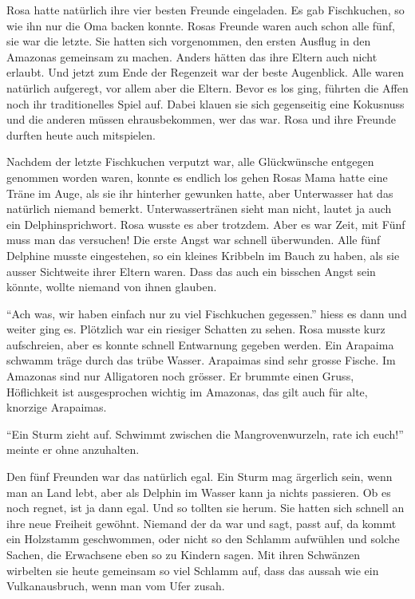Rosa hatte natürlich ihre vier besten Freunde eingeladen. Es gab Fischkuchen, so wie ihn nur die Oma backen konnte. Rosas Freunde waren auch schon alle fünf, sie war die letzte. Sie hatten sich vorgenommen, den ersten Ausflug in den Amazonas gemeinsam zu machen. Anders hätten das ihre Eltern auch nicht erlaubt. Und jetzt zum Ende der Regenzeit war der beste Augenblick. Alle waren natürlich aufgeregt, vor allem aber die Eltern. Bevor es los ging, führten die Affen noch ihr traditionelles Spiel auf. Dabei klauen sie sich gegenseitig eine Kokusnuss und die anderen müssen ehrausbekommen, wer das war. Rosa und ihre Freunde durften heute auch mitspielen.

Nachdem der letzte Fischkuchen verputzt war, alle Glückwünsche entgegen genommen worden waren, konnte es endlich los gehen Rosas Mama hatte eine Träne im Auge, als sie ihr hinterher gewunken hatte, aber Unterwasser hat das natürlich niemand bemerkt. Unterwassertränen sieht man nicht, lautet ja auch ein Delphinsprichwort. Rosa wusste es aber trotzdem. Aber es war Zeit, mit Fünf muss man das versuchen! Die erste Angst war schnell überwunden. Alle fünf Delphine musste eingestehen, so ein kleines Kribbeln im Bauch zu haben, als sie ausser Sichtweite ihrer Eltern waren. Dass das auch ein bisschen Angst sein könnte, wollte niemand von ihnen glauben.

\enquote{Ach was, wir haben einfach nur zu viel Fischkuchen gegessen.} hiess es dann und weiter ging es. Plötzlich war ein riesiger Schatten zu sehen. Rosa musste kurz aufschreien, aber es konnte schnell Entwarnung gegeben werden. Ein Arapaima schwamm träge durch das trübe Wasser. Arapaimas sind sehr grosse Fische. Im Amazonas sind nur Alligatoren noch grösser. Er brummte einen Gruss, Höflichkeit ist ausgesprochen wichtig im Amazonas, das gilt auch für alte, knorzige Arapaimas.

\enquote{Ein Sturm zieht auf. Schwimmt zwischen die Mangrovenwurzeln, rate ich euch!} meinte er ohne anzuhalten. 

Den fünf Freunden war das natürlich egal. Ein Sturm mag ärgerlich sein, wenn man an Land lebt, aber als Delphin im Wasser kann ja nichts passieren. Ob es noch regnet, ist ja dann egal. Und so tollten sie herum. Sie hatten sich schnell an ihre neue Freiheit gewöhnt. Niemand der da war und sagt, passt auf, da kommt ein Holzstamm geschwommen, oder nicht so den Schlamm aufwühlen und solche Sachen, die Erwachsene eben so zu Kindern sagen. Mit ihren Schwänzen wirbelten sie heute gemeinsam so viel Schlamm auf, dass das aussah wie ein Vulkanausbruch, wenn man vom Ufer zusah.

